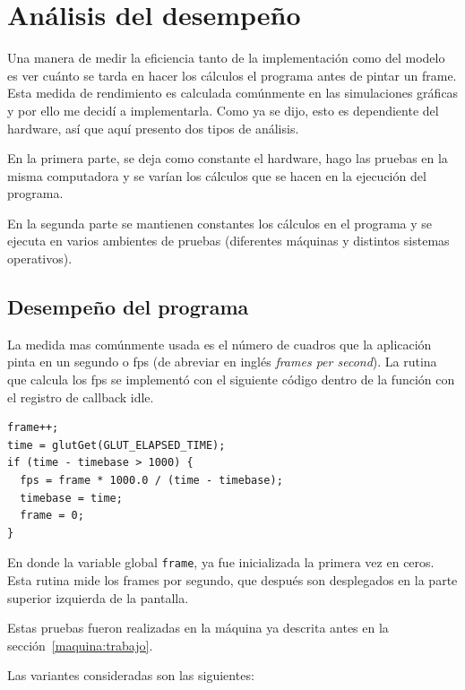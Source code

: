 \section{Análisis del desempeño}

Una manera de medir la eficiencia tanto de la implementación como del modelo es ver cuánto se tarda en hacer los cálculos el programa antes de pintar un frame. 
Esta medida de rendimiento es calculada comúnmente en las simulaciones gráficas y por ello me decidí a implementarla.
Como ya se dijo, esto es dependiente del hardware, así que aquí presento dos tipos de análisis.

En la primera parte, se deja como constante el hardware, hago las pruebas en la misma computadora y se varían los cálculos que se hacen en la ejecución del programa.

En la segunda parte se mantienen constantes los cálculos en el programa y se ejecuta en varios ambientes de pruebas (diferentes máquinas y distintos sistemas operativos).

\subsection{Desempeño del programa}

La medida mas comúnmente usada es el número de cuadros que la aplicación pinta en un segundo o fps (de abreviar en inglés \emph{\textenglish{frames per second}}).
La rutina que calcula los fps se implementó con el siguiente código dentro de la función con el registro de callback idle.

\begin{verbatim}
frame++;
time = glutGet(GLUT_ELAPSED_TIME);
if (time - timebase > 1000) {
  fps = frame * 1000.0 / (time - timebase);
  timebase = time;
  frame = 0;
}\end{verbatim}

En donde la variable global \verb|frame|, ya fue inicializada la primera vez en ceros.
Esta rutina mide los frames por segundo, que después son desplegados en la parte superior izquierda de la pantalla.

Estas pruebas fueron realizadas en la máquina ya descrita antes en la sección~\ref{maquina:trabajo}.

Las variantes consideradas son las siguientes:

